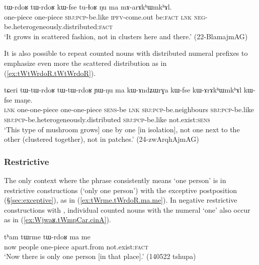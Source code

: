 \begin{exe}
	\ex \label{ex:tWrdoR.tWrdoR}
	\gll  tɯ-rdoʁ tɯ-rdoʁ kɯ-fse tu-ɬoʁ ŋu ma mɤ-arɤkʰɯmkʰɤl. \\
	one-piece one-piece \textsc{sbj}:\textsc{pcp}-be.like \textsc{ipfv}-come.out  be:\textsc{fact} \textsc{lnk} \textsc{neg}-be.heterogeneously.distributed:\textsc{fact} \\
	\glt `It grows in scattered fashion, not in clusters here and there.' (22-BlamajmAG)
\end{exe}

It is also possible to repeat counted nouns with distributed numeral prefixes to emphasize even more the scattered distribution as in (\ref{ex:tWtWrdoR.tWtWrdoR}).

\begin{exe}
	\ex \label{ex:tWtWrdoR.tWtWrdoR}
	\gll 
	tɕeri tɯ-tɯ-rdoʁ tɯ-tɯ-rdoʁ ɲɯ-ŋu ma kɯ-ɤndʑɯrɣa kɯ-fse kɯ-ɤrɤkʰɯmkʰɤl kɯ-fse maŋe.  \\
	\textsc{lnk} one-one-piece one-one-piece \textsc{sens}-be \textsc{lnk}  \textsc{sbj}:\textsc{pcp}-be.neighbours \textsc{sbj}:\textsc{pcp}-be.like \textsc{sbj}:\textsc{pcp}-be.heterogeneously.distributed \textsc{sbj}:\textsc{pcp}-be.like not.exist:\textsc{sens} \\
	\glt  `This type of mushroom grows] one by one [in isolation], not one next to the other (clustered together), not in patches.' (24-zwArqhAjmAG) 
\end{exe}


\subsubsection{Restrictive} \label{sec:CN.restrictive}
 
The only context where the phrase  consistently means `one person' is in restrictive constructions (`only one person') with the exceptive postposition  (§\ref{sec:exceptive}), as in (\ref{ex:tWrme.tWrdoR.ma.me}).  In negative restrictive constructions with , individual counted nouns with the numeral  `one' also occur as in (\ref{ex:Wjwaʁ.tWmpCar.cinA}).

\begin{exe}
	\ex \label{ex:tWrme.tWrdoR.ma.me}
	\gll tʰam tɯrme tɯ-rdoʁ ma me \\
	now people one-piece apart.from not.exist:\textsc{fact} \\
	\glt `Now there is only one person [in that place].' (140522 tshupa)
\end{exe} 

